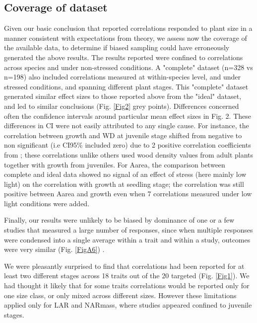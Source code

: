 \documentclass[a4paper]{article}\usepackage[]{graphicx}\usepackage[]{color}
\begin{document}
\subsection*{Coverage of dataset}

Given our basic conclusion that reported correlations responded to plant size in a manner consistent with expectations from theory, we assess now the coverage of the available data, to determine if biased sampling could have erroneously generated the above results. The results reported were confined to correlations across species and under non-stressed conditions. A "complete" dataset (n=328 vs n=198) also included correlations measured at within-species level, and under stressed conditions, and spanning different plant stages. This "complete" dataset generated similar effect sizes to those reported above from the "ideal" dataset, and led to similar conclusions (Fig. \ref{Fig2} grey points). Differences concerned often the confidence intervals around particular mean effect sizes in Fig. 2. These differences in CI were not easily attributed to any single cause. For instance, the correlation between growth and WD at juvenile stage shifted from negative to non significant (i.e CI95\% included zero) due to 2 positive correlation coefficients from \citet{Augspurger:1984ct};  these correlations unlike others used wood density values from adult plants together with growth from juveniles. For Aarea, the comparison between complete and ideal data showed no signal of an effect of stress (here mainly low light) on the correlation with growth at seedling stage; the correlation was still positive between Aarea and growth even when 7 correlations measured under low light conditions were added.

Finally, our results were unlikely to be biased by dominance of one or a few studies that measured a large number of responses, since when multiple responses were condensed into a single average within a trait and within a study, outcomes were very similar (Fig. \ref{FigA6}) . 


We were pleasantly surprised to find that correlations had been reported for at least two different stages across 18 traits out of the 20 targeted (Fig. \ref{Fig1}). We had thought it likely that for some traits correlations would be reported only for one size class, or only mixed across different sizes. However these limitations applied only for LAR and NARmass, where studies appeared confined to juvenile stages.  
\end{document}
